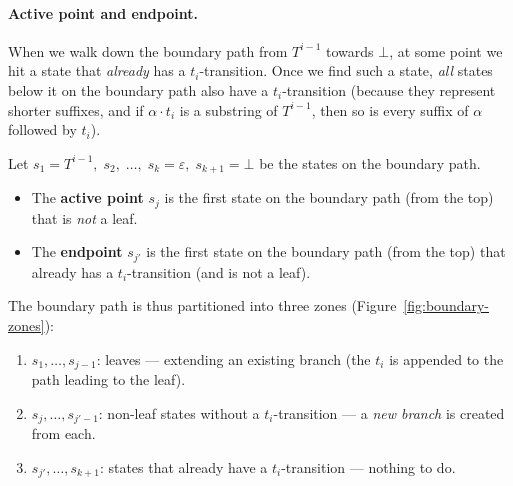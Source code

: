 \paragraph{Active point and endpoint.}
When we walk down the boundary path from $T^{i-1}$ towards $\bot$,
at some point we hit a state that \emph{already} has a
$t_i$-transition.
Once we find such a state, \emph{all} states below it on the boundary
path also have a $t_i$-transition (because they represent shorter
suffixes, and if $\alpha \cdot t_i$ is a substring of $T^{i-1}$, then
so is every suffix of $\alpha$ followed by $t_i$).

\begin{definition}
  \label{def:active-endpoint}
  Let $s_1 = T^{i-1},\; s_2,\; \ldots,\; s_k = \varepsilon,\;
  s_{k+1} = \bot$ be the states on the boundary path.
  \begin{itemize}[nosep]
    \item The \textbf{active point} $s_j$ is the first state on the
          boundary path (from the top) that is \emph{not} a leaf.
    \item The \textbf{endpoint} $s_{j'}$ is the first state on the
          boundary path (from the top) that already has a
          $t_i$-transition (and is not a leaf).
  \end{itemize}
  The boundary path is thus partitioned into three zones
  (Figure~\ref{fig:boundary-zones}):
  \begin{enumerate}[nosep]
    \item $s_1, \ldots, s_{j-1}$: leaves --- extending an existing
          branch (the $t_i$ is appended to the path leading to the leaf).
    \item $s_j, \ldots, s_{j'-1}$: non-leaf states without a
          $t_i$-transition --- a \emph{new branch} is created from each.
    \item $s_{j'}, \ldots, s_{k+1}$: states that already have a
          $t_i$-transition --- nothing to do.
  \end{enumerate}
\end{definition}

